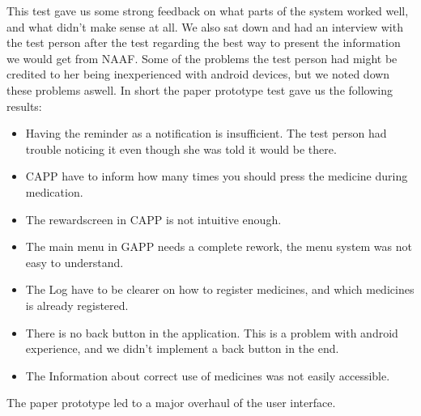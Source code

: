 This test gave us some strong feedback on what parts of the system worked well, and what didn't make sense at all. We also sat down and had an interview with
the test person after the test regarding the best way to present the information we would get from NAAF.
Some of the problems the test person had might be credited to her being inexperienced with android devices, but we noted down these problems aswell.
 In short the paper prototype test gave us the following results:

\begin{itemize}
	\item Having the reminder as a notification is insufficient. The test person had trouble noticing it even though she was told it would be there.
	\item CAPP have to inform how many times you should press the medicine during medication.
	\item The rewardscreen in CAPP is not intuitive enough.
	\item The main menu in GAPP needs a complete rework, the menu system was not easy to understand.
	\item The Log have to be clearer on how to register medicines, and which medicines is already registered.
	\item There is no back button in the application. This is a problem with android experience, and we didn't implement a back button in the end.
	\item The Information about correct use of medicines was not easily accessible.
\end{itemize} 
The paper prototype led to a major overhaul of the user interface.